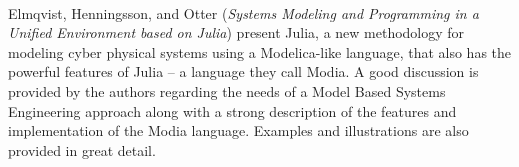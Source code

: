 

\ \hline \ %

Elmqvist, Henningsson, and Otter
\cite{isola-2016-elmqvist}
({\em Systems Modeling and Programming in a
Unified Environment based on Julia})
present Julia, a new methodology for modeling cyber physical systems using a Modelica-like language, that also has the powerful features of Julia -- a language they call Modia. A good discussion is provided by the authors regarding the needs of a Model Based Systems Engineering approach along with a strong description of the features and implementation of the Modia language. Examples and illustrations are also provided in great detail.

